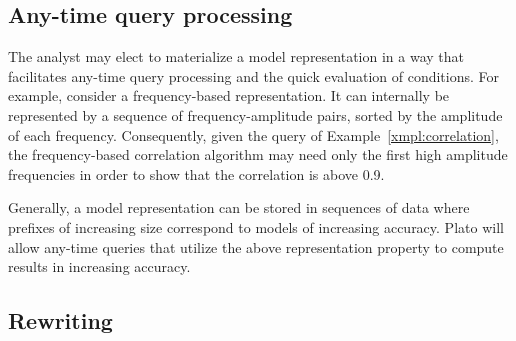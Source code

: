 \subsection{Any-time query processing}
\label{sec:anytime}
The analyst may elect to materialize a model representation in a way that facilitates any-time query processing and the quick evaluation of conditions. For example, consider a frequency-based representation. It can internally be represented by a sequence of frequency-amplitude pairs, sorted by the amplitude of each frequency. Consequently, given the query of Example~\ref{xmpl:correlation}, the frequency-based correlation algorithm may need only the first high amplitude frequencies in order to show that the correlation is above 0.9. 

Generally, a model representation can be stored in sequences of data where prefixes of increasing size correspond to models of increasing accuracy. Plato will allow any-time queries that utilize the above representation property to compute results in increasing accuracy.



\subsection{Rewriting}
